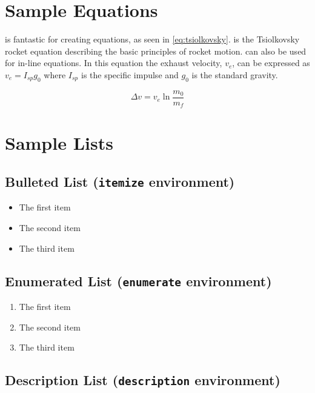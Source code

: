 \documentclass[]{nasa-latex-docs}
\begin{document}
\section{Sample Equations}

\latex is fantastic for creating equations, as seen in \ref{eq:tsiolkovsky}.  is the Tsiolkovsky rocket equation describing the basic principles of rocket motion. \latex can also be used for in-line equations. In this equation the exhaust velocity, $v_e$, can be expressed as $v_e=I_{sp}g_0$ where $I_{sp}$ is the specific impulse and $g_0$ is the standard gravity.

\begin{equation} \label{eq:tsiolkovsky}
   \Delta v = v_e\ln\frac{m_0}{m_f}
\end{equation}

\section{Sample Lists}


\subsection{Bulleted List (\texttt{itemize} environment)}

\begin{itemize}
  \item The first item
  \item The second item
  \item The third item
\end{itemize}

\subsection{Enumerated List (\texttt{enumerate} environment)}

\begin{enumerate}
  \item The first item
  \item The second item
  \item The third item
\end{enumerate}

\subsection{Description List (\texttt{description} environment)}
\end{document}
